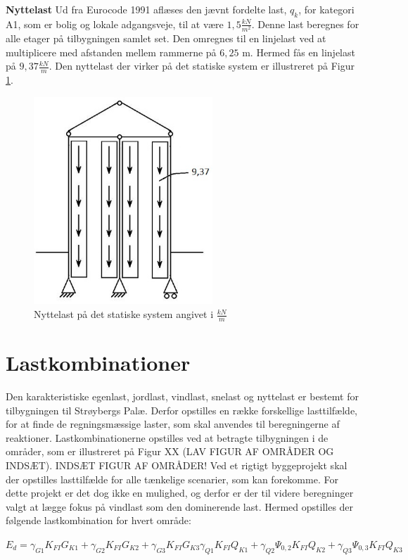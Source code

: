 \textbf{Nyttelast}
Ud fra Eurocode 1991 \citep[ tabel 6.2 kapitel 6.3.1.2]{EU91} aflæses den jævnt fordelte last, $q_k$, for kategori A1, som er bolig og lokale adgangsveje, til at være $1,\!5 \frac{kN}{m^2}$. Denne last beregnes for alle etager på tilbygningen samlet set. Den omregnes til en linjelast ved at multiplicere med afstanden mellem rammerne på $6,\!25$ m. Hermed fås en linjelast på $9,\!37 \frac{kN}{m}$. 
\newline \indent{     }  Den nyttelast der virker på det statiske system er illustreret på Figur \ref{fig:nyttelast}.

\begin{figure}[htbp]
	\centering
	\includegraphics[width=0.6\textwidth]{billeder/nyttelast.png}
	\caption{Nyttelast på det statiske system angivet i $\frac{kN}{m}$}
	\label{fig:nyttelast}
\end{figure}

\section{Lastkombinationer}
Den karakteristiske egenlast, jordlast, vindlast, snelast og nyttelast er bestemt for tilbygningen til Strøybergs Palæ. Derfor opstilles en række forskellige lasttilfælde, for at finde de regningsmæssige laster, som skal anvendes til beregningerne af reaktioner. Lastkombinationerne opstilles ved at betragte tilbygningen i de områder, som er illustreret på Figur XX (LAV FIGUR AF OMRÅDER OG INDSÆT).
\newline
\newline
INDSÆT FIGUR AF OMRÅDER!
\newline
\newline
Ved et rigtigt byggeprojekt skal der opstilles lasttilfælde for alle tænkelige scenarier, som kan forekomme. For dette projekt er det dog ikke en mulighed, og derfor er der til videre beregninger valgt at lægge fokus på vindlast som den dominerende last. Hermed opstilles der følgende lastkombination for hvert område:
\begin{center}
	$E_d = \gamma_{G1} K_{FI} G_{K1} + \gamma_{G2} K_{FI} G_{K2} + \gamma_{G3} K_{FI} G_{K3} \gamma_{Q1} K_{FI} Q_{K1} + \gamma_{Q2} \Psi_{0,2} K_{FI} Q_{K2} + \gamma_{Q3} \Psi_{0,3} K_{FI} Q_{K3}$ 
\end{center}

